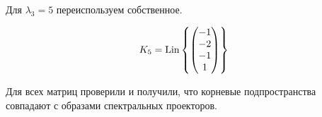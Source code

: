 \documentclass[12pt, a4paper]{article}
\begin{document}
    
    Для $\lambda_3 = 5$ переиспользуем собственное.

    \begin{equation}
        K_{5} = \operatorname{Lin} \left\{ \begin{pmatrix} -1\\-2\\-1\\1 \end{pmatrix} \right\}
    \end{equation}


    Для всех матриц проверили и получили, что корневые подпространства совпадают с образами спектральных проекторов.

    
\end{document}
